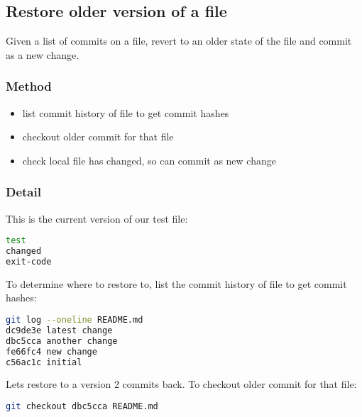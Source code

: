 
% 

\subsection*{Restore older version of a file}

\noindent Given a list of commits on a file, revert to an older state of the
file and commit as a new change.

\subsubsection*{Method}

\begin{itemize}
\item list commit history of file to get commit hashes
\item checkout older commit for that file
\item  check local file has changed, so can commit as new change
\end{itemize}

\subsubsection*{Detail}

\noindent This is the current version of our test file:

\begin{lstlisting}[language=Bash,caption={Test file: README.md},style=default]
test
changed
exit-code
\end{lstlisting}

\noindent To determine where to restore to, list the commit history of file to get commit
hashes:

\begin{lstlisting}[language=Bash,style=default]
git log --oneline README.md
dc9de3e latest change
dbc5cca another change
fe66fc4 new change
c56ac1c initial
\end{lstlisting}

\noindent Lets restore to a version 2 commits back. To checkout older commit
for that file:

\begin{lstlisting}[language=Bash,style=default]
git checkout dbc5cca README.md
\end{lstlisting}

